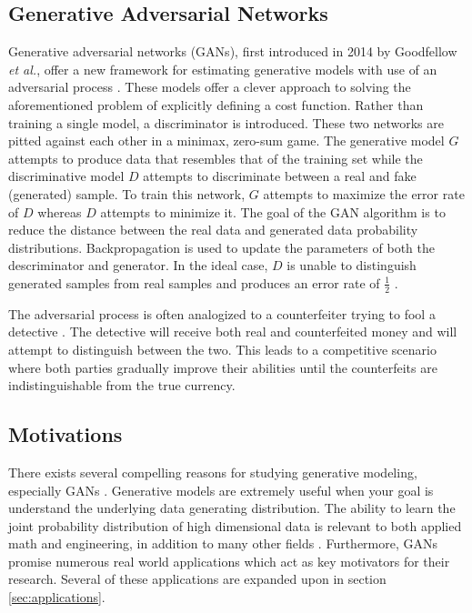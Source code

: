 \documentclass[11pt]{article}
\begin{document}
\subsection{Generative Adversarial Networks}
Generative adversarial networks (GANs), first introduced in 2014 by Goodfellow \textit{et al.}, offer a new framework for estimating generative models with use of an adversarial process \citep{2014arXiv1406.2661G}. These models offer a clever approach to solving the aforementioned problem of explicitly defining a cost function. Rather than training a single model, a discriminator is introduced. These two networks are pitted against each other in a minimax, zero-sum game. The generative model $G$ attempts to produce data that resembles that of the training set while the discriminative model $D$ attempts to discriminate between a real and fake (generated) sample. To train this network, $G$ attempts to maximize the error rate of $D$ whereas $D$ attempts to minimize it. The goal of the GAN algorithm is to reduce the distance between the real data and generated data probability distributions. Backpropagation is used to update the parameters of both the descriminator and generator. In the ideal case, $D$ is unable to distinguish generated samples from real samples and produces an error rate of $\frac{1}{2}$ \citep{2014arXiv1406.2661G}.

The adversarial process is often analogized to a counterfeiter trying to fool a detective \citep{2014arXiv1406.2661G}. The detective will receive both real and counterfeited money and will attempt to distinguish between the two. This leads to a competitive scenario where both parties gradually improve their abilities until the counterfeits are indistinguishable from the true currency.

\subsection{Motivations}
There exists several compelling reasons for studying generative modeling, especially GANs \citep{2017arXiv170100160G}. Generative models are extremely useful when your goal is understand the underlying data generating distribution. The ability to learn the joint probability distribution of high dimensional data is relevant to both applied math and engineering, in addition to many other fields \citep{2017arXiv170100160G}. Furthermore, GANs promise numerous real world applications which act as key motivators for their research. Several of these applications are expanded upon in section \ref{sec:applications}.
\end{document}
